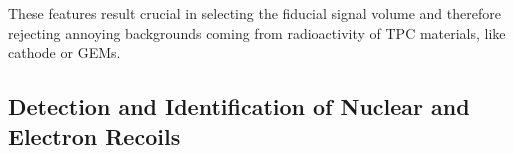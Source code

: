 \documentclass[physics,article,submit,moreauthors,pdftex]{Definitions/mdpi}
\newcommand{\keV}{\ensuremath{\,\textrm{ke\hspace{-.08em}V}}\xspace}
\newcommand{\eV}{\ensuremath{\,\textrm{e\hspace{-.08em}V}}\xspace}
\begin{document}
These features result crucial in selecting the fiducial signal volume and therefore rejecting annoying backgrounds coming from radioactivity of TPC materials, like cathode or GEMs.










\subsection{Detection and Identification of Nuclear and Electron Recoils}
\label{sect:rej}
\end{document}
